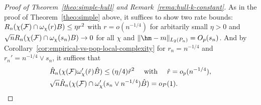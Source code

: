 \begin{proof}[Proof of Theorem~\ref{theo:simple-hull} and Remark~\ref{rema:hull-k-constant}]
As in the proof of Theorem~\ref{theo:simple} above, 
it suffices to show two rate bounds: 
$R_n(\chi(\mathcal{F}) \cap \omega_{\chi}(r)B) \le \eta r^2$ with $r=o(n^{-1/4})$ for arbitarily small $\eta > 0$
and $\sqrt{n}R_n(\chi(\mathcal{F}) \cap \omega_{\chi}(s_n)B) \to 0$ for all $\chi$
and $\norm{\hm - m}_{L_2(\Pn)} = O_p(s_n)$. 
And by Corollary~\ref{cor:empirical-vs-pop-local-complexity} for $r_n = n^{-1/4}$ and $r_n'=n^{-1/4} \vee s_n$,
it suffices that\footnotemark 
\begin{align}
&\hat R_n(\chi(\mathcal{F}) \omega_{\chi}'(\hat r)\hat B) \le (\eta/4) \hat r^2 \quad \text{ with } \quad \hat r = o_p(n^{-1/4}), \label{eq:hull-fixed-pt}\\
&\sqrt{n}\hat R_n(\chi(\mathcal{F}) \cap \omega_{\chi}'(s_n \vee n^{-1/4})\hat B) = o_P(1). \label{eq:hull-localized}
\end{align}




\end{proof}
